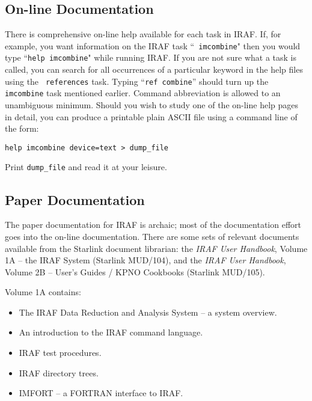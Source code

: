 \subsection*{On-line Documentation}

There is comprehensive on-line help available for each task in IRAF.
If, for example, you want information on the IRAF task ``{\tt
imcombine}" then you would type ``{\tt help imcombine}" while running
IRAF. If you are not sure what a task is called, you can search for all
occurrences of a particular keyword in the help files using the {\tt
references} task. Typing ``{\tt ref combine}'' should turn up the {\tt
imcombine} task mentioned earlier. Command abbreviation is allowed to
an unambiguous minimum. Should you wish to study one of the on-line
help pages in detail, you can produce a printable plain ASCII file
using a command line of the form:

{\tt help imcombine device=text > dump\_file }

Print {\tt dump\_file} and read it at your leisure.


\subsection*{Paper Documentation}

The paper documentation for IRAF is archaic;  most of the documentation
effort goes into the on-line documentation. There are some sets
of relevant documents available from the Starlink document
librarian:  the {\it IRAF User Handbook}\/, Volume 1A -- the
IRAF System (Starlink MUD/104), and the {\it IRAF User Handbook}\/,
Volume 2B -- User's Guides / KPNO Cookbooks (Starlink MUD/105).

Volume 1A contains:

\begin{itemize}

\item{The IRAF Data Reduction and Analysis System -- a system overview.}

\item{An introduction to the IRAF command language.}

\item{IRAF test procedures.}

\item{IRAF directory trees.}

\item{IMFORT -- a FORTRAN interface to IRAF.}

\end{itemize}


